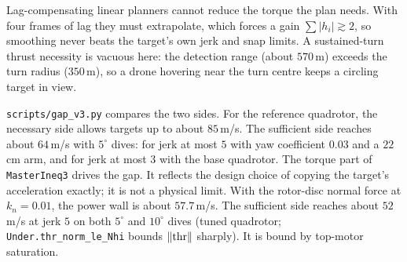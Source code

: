 \begin{remark}
Lag-compensating linear planners cannot reduce the torque the plan needs. With four
frames of lag they must extrapolate, which forces a gain $\sum|h_i|\gtrsim2$, so smoothing
never beats the target's own jerk and snap limits. A sustained-turn thrust necessity is
vacuous here: the detection range (about $570$\,m) exceeds the turn radius ($350$\,m), so
a drone hovering near the turn centre keeps a circling target in view.
\end{remark}

\begin{remark}
\texttt{scripts/gap\_v3.py} compares the two sides. For the reference quadrotor, the
necessary side allows targets up to about $85$\,m/s. The sufficient side reaches about
$64$\,m/s with $5^\circ$ dives: for jerk at most $5$ with yaw coefficient $0.03$ and a
$22$\,cm arm, and for jerk at most $3$ with the base quadrotor.
The torque part of \texttt{MasterIneq3} drives the gap. It reflects the design choice of
copying the target's acceleration exactly; it is not a physical limit.
With the rotor-disc normal force at $k_n=0.01$, the power wall is about $57.7$\,m/s. The
sufficient side reaches about $52$\,m/s at jerk $5$ on both $5^\circ$ and $10^\circ$ dives
(tuned quadrotor; \texttt{Under.thr\_norm\_le\_Nhi} bounds $\lVert \mathrm{thr} \rVert$ sharply).
It is bound by top-motor saturation.
\end{remark}
